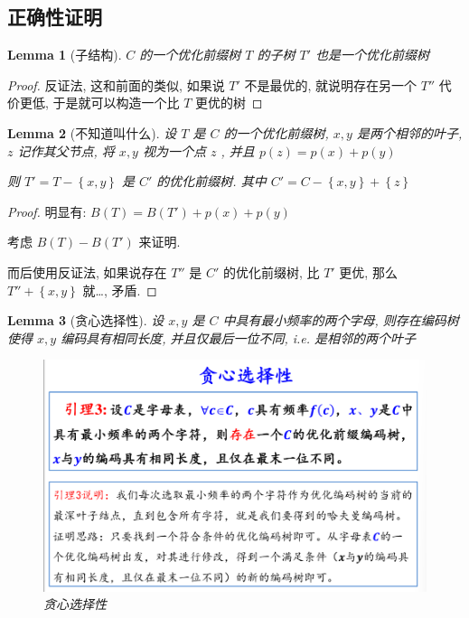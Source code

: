 \documentclass[a4paper, 10pt]{ctexart} %
\newtheorem{lemma}{Lemma}
\begin{document}
\subsection{正确性证明}
\begin{lemma}[子结构]
    $C$ 的一个优化前缀树 $T$ 的子树 $T'$ 也是一个优化前缀树
\end{lemma}
\begin{proof}
    反证法, 这和前面的类似, 
    如果说 $T'$ 不是最优的, 就说明存在另一个 $T''$  代价更低, 
    于是就可以构造一个比 $T$ 更优的树
\end{proof}
\begin{lemma}[不知道叫什么]
    设 $T$ 是 $C$ 的一个优化前缀树, $x,  y$ 是两个相邻的叶子, $z$ 记作其父节点,
    将 $x,  y$ 视为一个点 $z$ , 并且 $p (z) = p(x)+ p\left(y\right)$
    
    则  $T'= T- \left\{ x, y \right\} $ 是 $C'$ 的优化前缀树. 其中 $C'=C - \left\{x, y\right\}+ \left\{z\right\}$ 
\end{lemma}
\begin{proof}
    明显有: $B\left(T\right)=  B\left(T'\right) + p\left(x \right)+ p \left(y\right)$
    
    考虑 $B\left(T\right) - B\left(T'\right)$ 来证明. 

    而后使用反证法, 如果说存在 $T''$ 是 $C'$ 的优化前缀树, 比 $T'$ 更优, 
    那么 $T'' + \left\{x, y\right\}$ 就\dots, 矛盾.
\end{proof}
\begin{lemma}[贪心选择性]
    设 $x , y $ 是 $C$ 中具有最小频率的两个字母, 则存在编码树使得 $x,y$ 编码具有相同长度, 并且仅最后一位不同, i.e. 是相邻的两个叶子
    \begin{figure}[H]
        \centering
        \includegraphics[scale = 0.5]{3.png}
        \caption[]{贪心选择性}
    \end{figure}
\end{lemma}
\end{document}
